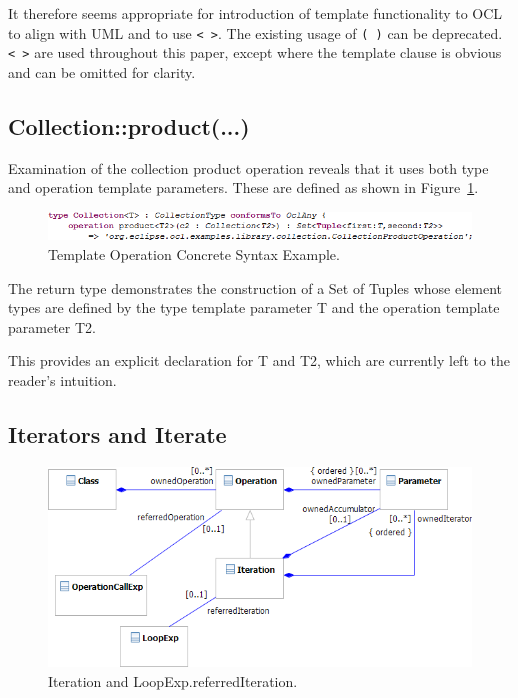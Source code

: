 \documentclass{eceasst}
\begin{document}
It therefore seems appropriate for introduction of template functionality to OCL to align with UML and to use \verb|< >|. The existing usage of \verb|( )| can be deprecated. \verb|< >| are used throughout this paper, except where the template clause is obvious and can be omitted for clarity.  

\subsection{Collection::product(...)}

Examination of the collection product operation reveals that it uses both type and operation template parameters. These are defined as shown in Figure~\ref{fig:TemplateOperation}.

\begin{figure}
  \begin{center}
    \includegraphics[width=5.75in]{TemplateOperation.png}
  \end{center}
  \caption{Template Operation Concrete Syntax Example.}
  \label{fig:TemplateOperation}
\end{figure}

The return type demonstrates the construction of a Set of Tuples whose element types are defined by the type template parameter T and the operation template parameter T2.

This provides an explicit declaration for T and T2, which are currently left to the reader's intuition.

\subsection{Iterators and Iterate}

\begin{figure}
  \begin{center}
    \includegraphics[width=5.75in]{Iteration.png}
  \end{center}
  \caption{Iteration and LoopExp.referredIteration.}
  \label{fig:Iteration}
\end{figure}
\end{document}
